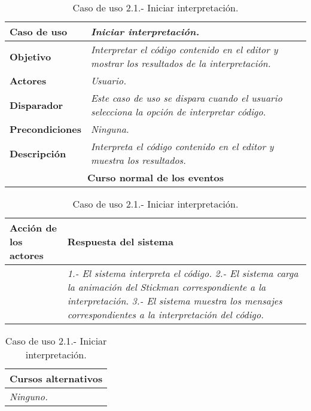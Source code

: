    \begin{table}[!ht] %
      \centering
      \begin{tabular}{|p{4cm}|p{11.5cm}|}
      \hline
      \textbf{Caso de uso} & \textit{Iniciar interpretación.}\\ \hline
      \textbf{Objetivo} & \textit{Interpretar el código contenido en el editor y mostrar los resultados de la interpretación.}\\ \hline
      \textbf{Actores} & \textit{Usuario.}\\ \hline
      \textbf{Disparador} & \textit{Este caso de uso se dispara cuando el usuario selecciona la opción de interpretar código.}\\ \hline
      \textbf{Precondiciones} & \textit{Ninguna.}\\ \hline
      \textbf{Descripción} & \textit{Interpreta el código contenido en el editor y muestra los resultados.}\\ \hline
      \multicolumn{2}{|c|}{\textbf{Curso normal de los eventos}}\\ \hline
    \end{tabular}
    \begin{tabular}{|p{7.75cm}|p{7.75cm}|}
      \hspace{2cm}\textbf{Acción de los actores} & \hspace{1.75cm}\textbf{Respuesta del sistema}\\ \hline
            & \textit{1.- El sistema interpreta el código.} \textit{2.- El sistema carga la animación del Stickman correspondiente a la interpretación.}
               \textit{3.- El sistema muestra los mensajes correspondientes a la interpretación del código.} \\ \hline
    \end{tabular}
    \begin{tabular}{|p{15.9cm}|}
      \hspace{6cm}\textbf{Cursos alternativos}\\ \hline     
      \textit{Ninguno.} \\ \hline
    \end{tabular}
    \caption{Caso de uso 2.1.- Iniciar interpretación.}
   \end{table}


